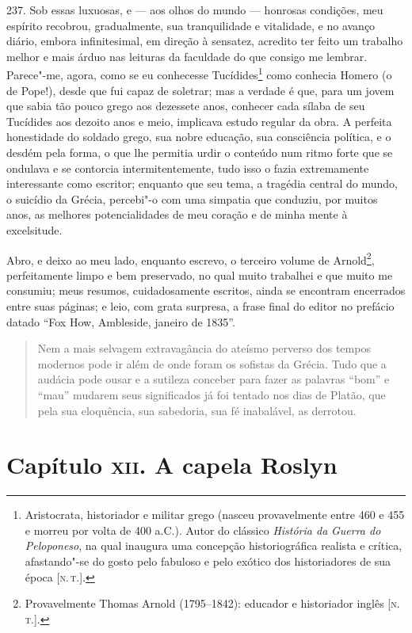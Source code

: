 237. Sob essas luxuosas, e --- aos olhos do mundo --- honrosas condições,
meu espírito recobrou, gradualmente, sua tranquilidade e vitalidade, e
no avanço diário, embora infinitesimal, em direção à sensatez, acredito
ter feito um trabalho melhor e mais árduo nas leituras da faculdade do
que consigo me lembrar. Parece"-me, agora, como se eu conhecesse
Tucídides\footnote{Aristocrata, historiador e militar grego (nasceu
  provavelmente entre 460 e 455 e morreu por volta de 400 a.C.). Autor
  do clássico \emph{História da} \emph{Guerra do Peloponeso}, na qual
  inaugura uma concepção historiográfica realista e crítica,
  afastando"-se do gosto pelo fabuloso e pelo exótico dos historiadores
  de sua época {[}\textsc{n.\,t.}{]}.} como conhecia Homero (o de Pope!), desde
que fui capaz de soletrar; mas a verdade é que, para um jovem que sabia
tão pouco grego aos dezessete anos, conhecer cada sílaba de seu
Tucídides aos dezoito anos e meio, implicava estudo regular da obra. A
perfeita honestidade do soldado grego, sua nobre educação, sua
consciência política, e o desdém pela forma, o que lhe permitia urdir o
conteúdo num ritmo forte que se ondulava e se contorcia
intermitentemente, tudo isso o fazia extremamente interessante como
escritor; enquanto que seu tema, a tragédia central do mundo, o suicídio
da Grécia, percebi"-o com uma simpatia que conduziu, por muitos anos, as
melhores potencialidades de meu coração e de minha mente à excelsitude.

Abro, e deixo ao meu lado, enquanto escrevo, o terceiro volume de
Arnold\footnote{Provavelmente Thomas Arnold (1795--1842): educador e
  historiador inglês {[}\textsc{n.\,t.}{]}.}, perfeitamente limpo e bem
preservado, no qual muito trabalhei e que muito me consumiu; meus
resumos, cuidadosamente escritos, ainda se encontram encerrados entre
suas páginas; e leio, com grata surpresa, a frase final do editor no
prefácio datado ``Fox How, Ambleside, janeiro de 1835''.

\begin{quote}
Nem a mais selvagem extravagância do ateísmo perverso dos tempos
modernos pode ir além de onde foram os sofistas da Grécia. Tudo que a
audácia pode ousar e a sutileza conceber para fazer as palavras ``bom''
e ``mau'' mudarem seus significados já foi tentado nos dias de Platão,
que pela sua eloquência, sua sabedoria, sua fé inabalável, as
derrotou.
\end{quote}

\chapter{Capítulo \textsc{xii}. A capela Roslyn}

